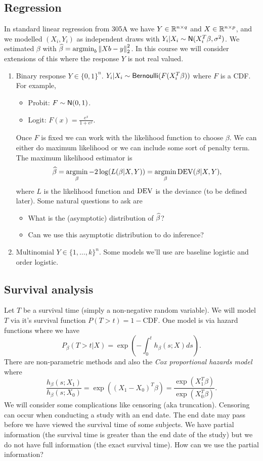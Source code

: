 \subsection{Regression}
In standard linear regression from 305A we have $Y \in {\mathbb R}^{n \times q}$ and $X \in {\mathbb R}^{n \times p}$, and we modelled $(X_i,Y_i)$ as independent draws with $Y_i |X_i \sim \mathsf{N}(X_i^T\beta,\sigma^2)$. We estimated $\beta$ with $\widehat{\beta} = \operatorname*{argmin}_b \left\|Xb-y\right\|_2^2$. In this course we will consider extensions of this  where the response $Y$ is not real valued.
\begin{enumerate}
    \item Binary response $Y \in \{0,1\}^n$. $Y_i|X_i \sim \mathsf{Bernoulli}(F(X_i^T\beta))$ where $F$ is a CDF. For example,
    \begin{itemize}
        \item Probit: $F \sim \mathsf{N}(0,1)$.
        \item Logit: $F(x) = \frac{e^x}{1+e^x}$.
    \end{itemize}
    Once $F$ is fixed we can work with the likelihood function to choose $\beta$. We can either do maximum likelihood or we can include some sort of penalty term. The maximum likelihood estimator is
    \[\widehat{\beta} = \operatorname*{argmin}_\beta -2\log(L(\beta|X,Y)) = \operatorname*{argmin}_\beta \operatorname{DEV}(\beta | X,Y), \]
    where $L$ is the likelihood function and $\operatorname{DEV}$ is the deviance (to be defined later). Some natural questions to ask are
    \begin{itemize}
        \item What is the (asymptotic) distribution of $\widehat{\beta}$?
        \item Can we  use this asymptotic distribution to do inference?
    \end{itemize}
    \item Multinomial $Y \in \{1,\ldots, k\}^n$. Some models we'll use are baseline logistic and order logistic.
\end{enumerate}
\subsection{Survival analysis}
Let $T$ be a survival time (simply a non-negative random variable). We will model $T$ via it's survival function $P(T > t) = 1-\text{CDF}$. One model is via hazard functions where we have
\[P_\beta(T > t |X) = \exp\left(-\int_0^t h_\beta(s;X)ds\right). \]
There are non-parametric methods and also the \emph{Cox proportional hazards model} where
\[\frac{h_\beta(s;X_1)}{h_\beta(s;X_0)} = \exp\left((X_1-X_0)^T\beta\right) = \frac{\exp(X_1^T\beta)}{\exp(X_0^T\beta)}. \]
We will consider some complications like censoring (aka truncation). Censoring can occur when conducting a study with an end date. The end date may pass before we have viewed the survival time of some subjects. We have partial information (the survival time is greater than the end date of the study) but we do not have full information (the exact survival time). How can we use the partial information?

